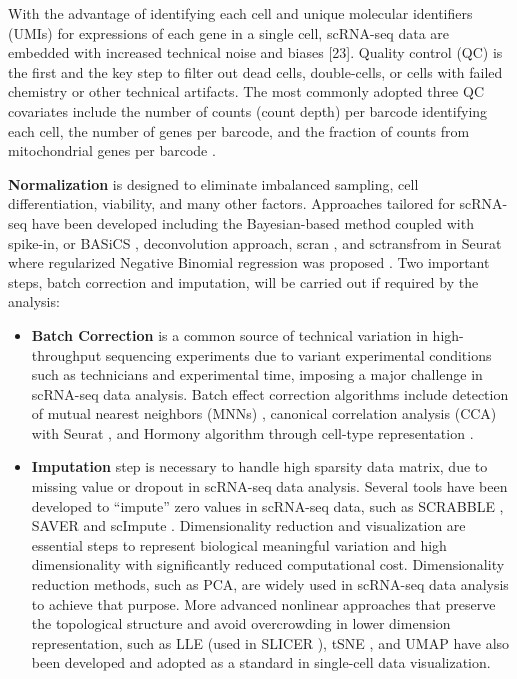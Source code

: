 \documentclass[
]{book}
\begin{document}
With the advantage of identifying each cell and unique molecular identifiers (UMIs) for expressions of each gene in a single cell, scRNA-seq data are embedded with increased technical noise and biases {[}23{]}. Quality control (QC) is the first and the key step to filter out dead cells, double-cells, or cells with failed chemistry or other technical artifacts. The most commonly adopted three QC covariates include the number of counts (count depth) per barcode identifying each cell, the number of genes per barcode, and the fraction of counts from mitochondrial genes per barcode \citep{RN81}.

\textbf{Normalization} is designed to eliminate imbalanced sampling, cell differentiation, viability, and many other factors. Approaches tailored for scRNA-seq have been developed including the Bayesian-based method coupled with spike-in, or BASiCS \citep{RN97}, deconvolution approach, scran \citep{RN89}, and sctransfrom in Seurat where regularized Negative Binomial regression was proposed \citep{RN83}. Two important steps, batch correction and imputation, will be carried out if required by the analysis:

\begin{itemize}
\item
  \textbf{Batch Correction} is a common source of technical variation in high-throughput sequencing experiments due to variant experimental conditions such as technicians and experimental time, imposing a major challenge in scRNA-seq data analysis. Batch effect correction algorithms include detection of mutual nearest neighbors (MNNs) \citep{RN84} , canonical correlation analysis (CCA) with Seurat \citep{RN79}, and Hormony algorithm through cell-type representation \citep{RN74}.
\item
  \textbf{Imputation} step is necessary to handle high sparsity data matrix, due to missing value or dropout in scRNA-seq data analysis. Several tools have been developed to ``impute'' zero values in scRNA-seq data, such as SCRABBLE \citep{RN29}, SAVER \citep{RN30} and scImpute \citep{RN31}.
  Dimensionality reduction and visualization are essential steps to represent biological meaningful variation and high dimensionality with significantly reduced computational cost. Dimensionality reduction methods, such as PCA, are widely used in scRNA-seq data analysis to achieve that purpose. More advanced nonlinear approaches that preserve the topological structure and avoid overcrowding in lower dimension representation, such as LLE \citep{RN32} (used in SLICER \citep{RN33}), tSNE \citep{RN34}, and UMAP \citep{RN35} have also been developed and adopted as a standard in single-cell data visualization.
\end{itemize}
\end{document}
